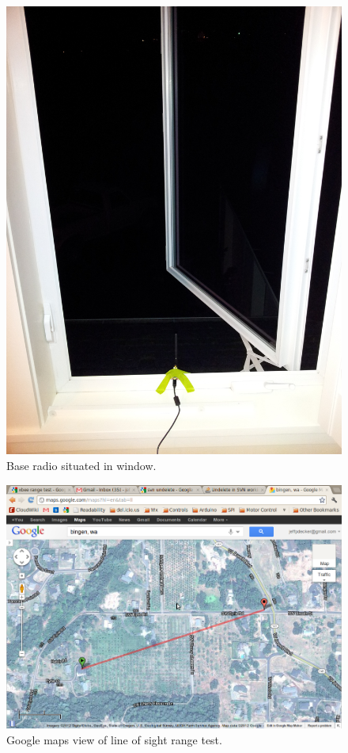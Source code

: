 \documentclass[11pt,letterpaper]{article}
\begin{document}
\begin{figure}[htb]
\begin{center}
\includegraphics[scale=.1, angle = 270]{xbeeWindow.jpg}
\centering
\caption{Base radio situated in window.}
\label{xbeewindow}
\end{center}
\end{figure}

\begin{figure}[htb]
\begin{center}
\includegraphics[scale=0.6, trim = 50mm 40mm 60mm 60mm, clip]{googleMaps.png}
\centering
\caption{Google maps view of line of sight range test.}
\label{googleMaps}
\end{center}
\end{figure}
\end{document}
